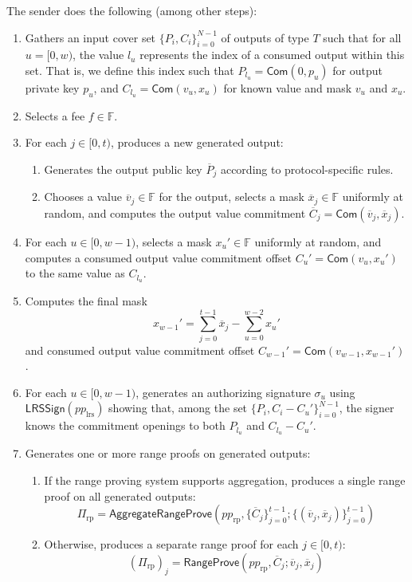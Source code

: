 \documentclass{article}
\newcommand{\F}{\mathbb{F}}
\newcommand{\func}[1]{\mathsf{#1}}
\newcommand{\com}{\func{Com}}
\begin{document}
The sender does the following (among other steps):
\begin{enumerate}
    \item Gathers an input cover set $\{P_i,C_i\}_{i=0}^{N-1}$ of outputs of type $T$ such that for all $u = [0,w)$, the value $l_u$ represents the index of a consumed output within this set.
    That is, we define this index such that $P_{l_u} = \com(0,p_u)$ for output private key $p_u$, and $C_{l_u} = \com(v_u,x_u)$ for known value and mask $v_u$ and $x_u$.
    \item Selects a fee $f \in \F$.
    \item For each $j \in [0,t)$, produces a new generated output:
    \begin{enumerate}
        \item Generates the output public key $\overline{P}_j$ according to protocol-specific rules.
        \item Chooses a value $\overline{v}_j \in \F$ for the output, selects a mask $\overline{x}_j \in \F$ uniformly at random, and computes the output value commitment $\overline{C}_j = \com(\overline{v}_j,\overline{x}_j)$.
    \end{enumerate}
    \item\label{step:transfer-prover-input-masks} For each $u \in [0,w-1)$, selects a mask $x_u' \in \F$ uniformly at random, and computes a consumed output value commitment offset $C_u' = \com(v_u,x_u')$ to the same value as $C_{l_u}$.
    \item\label{step:transfer-prover-last-mask} Computes the final mask $$x_{w-1}' = \sum_{j=0}^{t-1} \overline{x}_j - \sum_{u=0}^{w-2} x_u'$$ and consumed output value commitment offset $C_{w-1}' = \com(v_{w-1},x_{w-1}')$.
    \item For each $u \in [0,w-1)$, generates an authorizing signature $\sigma_u$ using $\func{LRSSign}(pp_{\text{lrs}})$ showing that, among the set $\{P_i, C_i - C_u'\}_{i=0}^{N-1}$, the signer knows the commitment openings to both $P_{l_u}$ and $C_{l_u} - C_u'$.
    \item Generates one or more range proofs on generated outputs:
    \begin{enumerate}
        \item If the range proving system supports aggregation, produces a single range proof on all generated outputs:
        $$\Pi_{\text{rp}} = \func{AggregateRangeProve}(pp_{\text{rp}},\{\overline{C}_j\}_{j=0}^{t-1} ; \{(\overline{v}_j, \overline{x}_j)\}_{j=0}^{t-1})$$
        \item Otherwise, produces a separate range proof for each $j \in [0,t)$:
        $$(\Pi_{\text{rp}})_j = \func{RangeProve}(pp_{\text{rp}},\overline{C}_j ; \overline{v}_j, \overline{x}_j)$$
    \end{enumerate}
\end{enumerate}
\end{document}
